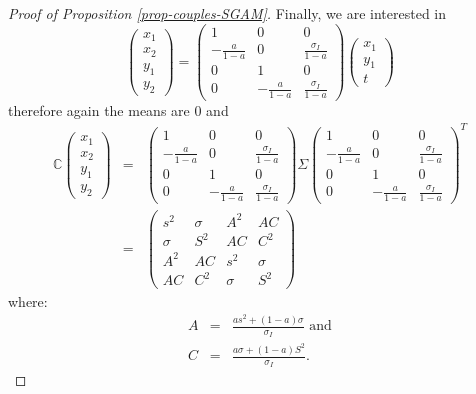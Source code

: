 \documentclass[
]{article}
\theoremstyle{definition}
\theoremstyle{definition}
\theoremstyle{definition}
\theoremstyle{definition}
\theoremstyle{remark}
\begin{document}
\begin{proof}[Proof of Proposition \ref{prop-couples-SGAM}]
Finally, we are interested in 
\[
\left( 
\begin{array}{c}
x_{1} \\ 
x_{2} \\ 
y_{1} \\ 
y_{2}%
\end{array}%
\right) =\left( 
\begin{array}{ccc}
1 & 0 & 0 \\ 
-\frac{a}{1-a} & 0 & \frac{\sigma_I}{1-a} \\ 
0 & 1 & 0 \\ 
0 & -\frac{a}{1-a} & \frac{\sigma_I}{1-a}%
\end{array}%
\right) \left( 
\begin{array}{c}
x_{1} \\ 
y_{1} \\ 
t%
\end{array}%
\right) 
\]%
therefore again the means are 0 and 
\begin{eqnarray*}
\mathbb{C}\left( 
\begin{array}{c}
x_{1} \\ 
x_{2} \\ 
y_{1} \\ 
y_{2}%
\end{array}%
\right) &=&\left( 
\begin{array}{ccc}
1 & 0 & 0 \\ 
-\frac{a}{1-a} & 0 & \frac{\sigma_I}{1-a} \\ 
0 & 1 & 0 \\ 
0 & -\frac{a}{1-a} & \frac{\sigma_I}{1-a}%
\end{array}%
\right) \Sigma \left( 
\begin{array}{ccc}
1 & 0 & 0 \\ 
-\frac{a}{1-a} & 0 & \frac{\sigma_I}{1-a} \\ 
0 & 1 & 0 \\ 
0 & -\frac{a}{1-a} & \frac{\sigma_I}{1-a}%
\end{array}%
\right) ^{T} \\
&=&\allowbreak \left( 
\begin{array}{cccc}
s^{2} & \sigma & A^{2} & AC \\ 
\sigma & S^{2} & AC & C^{2} \\ 
A^{2} & AC & s^{2} & \sigma \\ 
AC & C^{2} & \sigma & S^{2}%
\end{array}%
\right) \allowbreak
\end{eqnarray*}%
where:%
\begin{eqnarray*}
A &=&\frac{as^{2}+\left( 1-a\right) \sigma }{\sigma_I}\text{ \ and} \\
C &=&\frac{a\sigma +\left( 1-a\right) S^{2}}{\sigma_I}.
\end{eqnarray*}

\end{proof}
\end{document}

